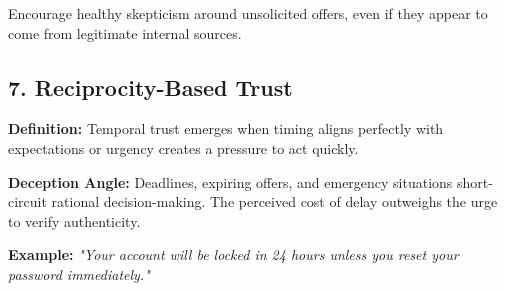     Encourage healthy skepticism around unsolicited offers, even if they appear to come from legitimate internal sources.

\subsection{7. Reciprocity-Based Trust}
{\justifying
\noindent\textbf{{Definition:} }Temporal trust emerges when timing aligns perfectly with expectations or urgency creates a pressure to act quickly.}
{\justifying
\par\noindent\textbf{\textbf{Deception Angle:} }Deadlines, expiring offers, and emergency situations short-circuit rational decision-making. The perceived cost of delay outweighs the urge to verify authenticity.}
{\justifying
\textbf{\textbf{Example:}} \textit{"Your account will be locked in 24 hours unless you reset your password immediately."}}




